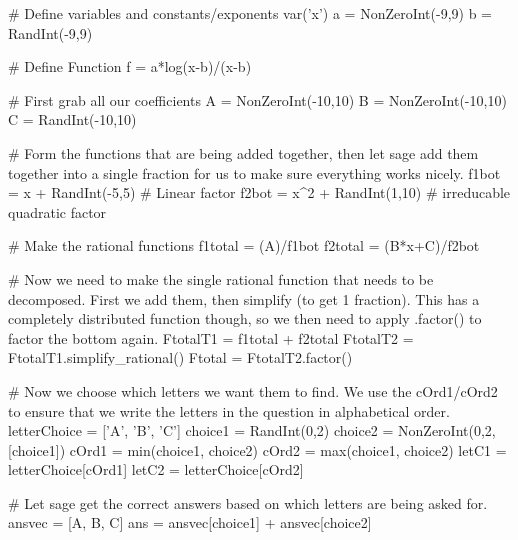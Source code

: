 
\begin{sagesilent}
# Define variables and constants/exponents
var('x')
a = NonZeroInt(-9,9)
b = RandInt(-9,9)

# Define Function
f = a*log(x-b)/(x-b)
\end{sagesilent}



\begin{sagesilent}
# First grab all our coefficients
A = NonZeroInt(-10,10)
B = NonZeroInt(-10,10)
C = RandInt(-10,10)

# Form the functions that are being added together, then let sage add them together into a single fraction for us to make sure everything works nicely.
f1bot = x + RandInt(-5,5) # Linear factor
f2bot = x^2 + RandInt(1,10) # irreducable quadratic factor

# Make the rational functions
f1total = (A)/f1bot
f2total = (B*x+C)/f2bot

# Now we need to make the single rational function that needs to be decomposed. First we add them, then simplify (to get 1 fraction). This has a completely distributed function though, so we then need to apply .factor() to factor the bottom again.
FtotalT1 = f1total + f2total
FtotalT2 = FtotalT1.simplify_rational()
Ftotal = FtotalT2.factor()

# Now we choose which letters we want them to find. We use the cOrd1/cOrd2 to ensure that we write the letters in the question in alphabetical order.
letterChoice = ['A', 'B', 'C']
choice1 = RandInt(0,2)
choice2 = NonZeroInt(0,2,[choice1])
cOrd1 = min(choice1, choice2)
cOrd2 = max(choice1, choice2)
letC1 = letterChoice[cOrd1]
letC2 = letterChoice[cOrd2]

# Let sage get the correct answers based on which letters are being asked for.
ansvec = [A, B, C]
ans = ansvec[choice1] + ansvec[choice2]

\end{sagesilent}

